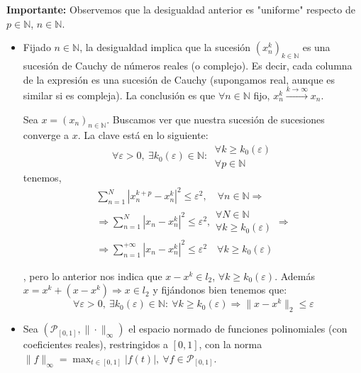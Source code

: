 \documentclass{article}
\begin{document}
\begin{enumerate}
\textbf{Importante:} Observemos que la desigualdad anterior es "uniforme" respecto de $p\in \mathbb{N}$, $n\in \mathbb{N}$. 

\begin{itemize}
\item Fijado $n\in\mathbb{N}$, la desigualdad implica que la sucesión $(x_n^k)_{k\in\mathbb{N}}$ es una sucesión de Cauchy de números reales (o complejo). Es decir, cada columna de la expresión es una sucesión de Cauchy (supongamos real, aunque es similar si es compleja). La conclusión es que $\forall n\in\mathbb{N}$ fijo, $x_n^k\xrightarrow{k\to\infty}x_n$.

Sea $x=(x_n)_{n\in\mathbb{N}}$. Buscamos ver que nuestra sucesión de sucesiones converge a $x$. La clave está en lo siguiente:
\begin{equation*}
\forall \varepsilon >0,\:\exists k_0(\varepsilon)\in\mathbb{N}:\:\left.\begin{array}{c}
\forall k\geq k_0(\varepsilon)\\
\forall p\in\mathbb{N}
\end{array}\right. 
\end{equation*}
tenemos,
\begin{gather*}
\sum_{n=1}^N|x_n^{k+p}-x_n^k|^2\leq \varepsilon^2,\quad \forall n\in\mathbb{N}\Rightarrow\\
\Rightarrow \sum_{n=1}^N|x_n-x_n^k|^2\leq \varepsilon^2,\left.\begin{array}{c}
\forall N\in\mathbb{N}\\
\forall k\geq k_0(\varepsilon)
\end{array}\right.\Rightarrow\\
\Rightarrow \sum_{n=1}^{+\infty}|x_n-x_n^k|^2\leq \varepsilon^2 \quad \forall k\geq k_0(\varepsilon)
\end{gather*}

, pero lo anterior nos indica que $x-x^k\in l_2$, $\forall k\geq k_0(\varepsilon)$. Además $x=x^k+(x-x^k)\Rightarrow x\in l_2$ y fijándonos bien tenemos que:
\begin{equation*}
\forall \varepsilon>0,\:\exists k_0(\varepsilon)\in\mathbb{N}:\:\forall k\geq k_0(\varepsilon)\Rightarrow\|x-x^k\|_2\leq \varepsilon
\end{equation*}

\item Sea $(\mathcal{P}_{[0,1]},\|\cdot\|_\infty)$ el espacio normado de funciones polinomiales (con coeficientes reales), restringidos a $[0,1]$, con la norma $\|f\|_\infty=\max_{t\in[0,1]}|f(t)|,\:\forall f\in\mathcal{P}_{[0,1]}$.


\end{itemize}
\end{enumerate}
\end{document}
